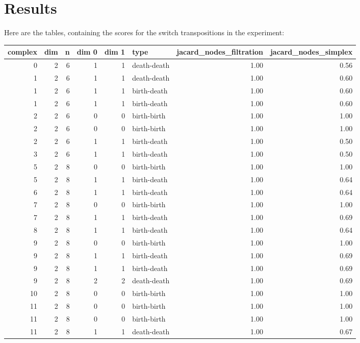 \documentclass{article}
\begin{document}
\section{Results}

\par Here are the tables, containing the scores for the switch transpositions in the experiment:

\begin{center}
\begin{tabular}{rrrrrlrr}
\toprule
complex & dim & n & dim 0 & dim 1 & type & jacard\_nodes\_filtration & jacard\_nodes\_simplex \\
\midrule
0 & 2 & 6 & 1 & 1 & death-death & 1.00 & 0.56 \\
1 & 2 & 6 & 1 & 1 & death-death & 1.00 & 0.60 \\
1 & 2 & 6 & 1 & 1 & birth-death & 1.00 & 0.60 \\
1 & 2 & 6 & 1 & 1 & birth-death & 1.00 & 0.60 \\
2 & 2 & 6 & 0 & 0 & birth-birth & 1.00 & 1.00 \\
2 & 2 & 6 & 0 & 0 & birth-birth & 1.00 & 1.00 \\
2 & 2 & 6 & 1 & 1 & birth-death & 1.00 & 0.50 \\
3 & 2 & 6 & 1 & 1 & birth-death & 1.00 & 0.50 \\
5 & 2 & 8 & 0 & 0 & birth-birth & 1.00 & 1.00 \\
5 & 2 & 8 & 1 & 1 & birth-death & 1.00 & 0.64 \\
6 & 2 & 8 & 1 & 1 & birth-death & 1.00 & 0.64 \\
7 & 2 & 8 & 0 & 0 & birth-birth & 1.00 & 1.00 \\
7 & 2 & 8 & 1 & 1 & birth-death & 1.00 & 0.69 \\
8 & 2 & 8 & 1 & 1 & birth-death & 1.00 & 0.64 \\
9 & 2 & 8 & 0 & 0 & birth-birth & 1.00 & 1.00 \\
9 & 2 & 8 & 1 & 1 & birth-death & 1.00 & 0.69 \\
9 & 2 & 8 & 1 & 1 & birth-death & 1.00 & 0.69 \\
9 & 2 & 8 & 2 & 2 & death-death & 1.00 & 0.69 \\
10 & 2 & 8 & 0 & 0 & birth-birth & 1.00 & 1.00 \\
11 & 2 & 8 & 0 & 0 & birth-birth & 1.00 & 1.00 \\
11 & 2 & 8 & 0 & 0 & birth-birth & 1.00 & 1.00 \\
11 & 2 & 8 & 1 & 1 & death-death & 1.00 & 0.67 \\

\end{tabular}
\end{center}
\end{document}
